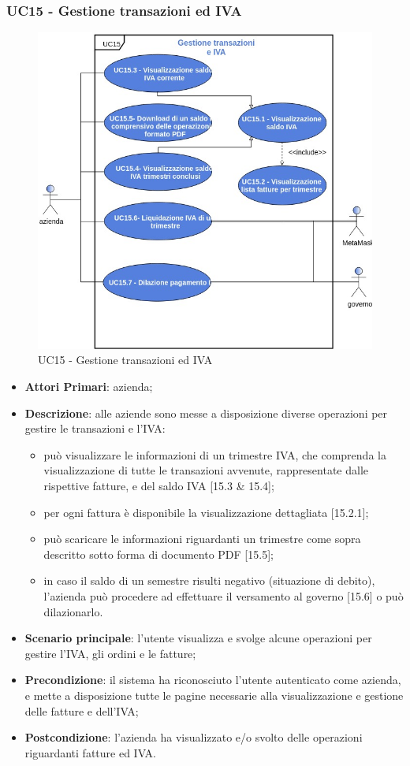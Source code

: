 \subsubsection{UC15 - Gestione transazioni ed IVA}
\begin{figure}[H]
	\includegraphics[width=12cm]{res/images/UC15.jpg}
	\centering
	\caption{UC15 - Gestione transazioni ed IVA}
\end{figure}
\begin{itemize}
	\item \textbf{Attori Primari}: azienda;
	\item \textbf{Descrizione}: alle aziende sono messe a disposizione diverse operazioni per gestire le transazioni e l'IVA:
	\begin{itemize}
		\item può visualizzare le informazioni di un trimestre IVA, che comprenda la visualizzazione di tutte le transazioni avvenute, rappresentate dalle rispettive fatture, e del saldo IVA [15.3 \& 15.4];
		\item per ogni fattura è disponibile la visualizzazione dettagliata [15.2.1];
		\item può scaricare le informazioni riguardanti un trimestre come sopra descritto sotto forma di documento PDF [15.5]; 
		\item in caso il saldo di un semestre risulti negativo (situazione di debito), l'azienda può procedere ad effettuare il versamento al governo [15.6] o può dilazionarlo\glosp [15.7].
	\end{itemize}
	\item \textbf{Scenario principale}: l'utente visualizza e svolge alcune operazioni per gestire l'IVA, gli ordini e le fatture;
	\item \textbf{Precondizione}: il sistema ha riconosciuto l'utente autenticato come azienda, e mette a disposizione tutte le pagine necessarie alla visualizzazione e gestione delle fatture e dell'IVA;
	\item \textbf{Postcondizione}: l'azienda ha visualizzato e/o svolto delle operazioni riguardanti fatture ed IVA.
\end{itemize} 

